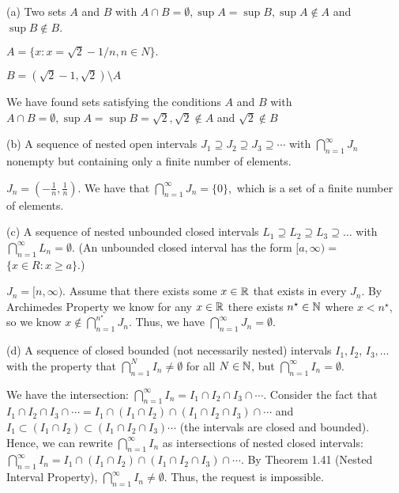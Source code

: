 \documentclass{report}
\begin{document}

(a) Two sets $A$ and $B$ with $A \cap B=\emptyset, \sup A=\sup B, \sup A \notin A$ and $\sup B \notin B$.

\par \bigskip 
$ A = \{ x : x = \sqrt{2} - 1/n, n \in N \}.$ \par $B = (\sqrt{2} -1,\sqrt{2}) \setminus A$ 
\par We have found sets satisfying the conditions $A$ and $B$ with $A \cap B=\emptyset, \sup A=\sup B = \sqrt{2}, \sqrt{2} \notin A$ and $\sqrt{2} \notin B$


\par \bigskip
(b) A sequence of nested open intervals $J_1 \supseteq J_2 \supseteq J_3 \supseteq \cdots$ with $\bigcap_{n=1}^{\infty} J_n$ nonempty but containing only a finite number of elements.
\par \bigskip 
$J_n = (-\frac{1}{n}, \frac{1}{n})$. We have that $\bigcap_{n=1}^{\infty} J_n = \{0\},$ which is a set of a finite number of elements.
\par \bigskip
(c) A sequence of nested unbounded closed intervals $L_1 \supseteq L_2 \supseteq L_3 \supseteq \ldots$ with $\bigcap_{n=1}^{\infty} L_n=\emptyset$. (An unbounded closed interval has the form $[a, \infty)=$ $\{x \in R: x \geq a\}$.)
\bigskip

$J_n = [n, \infty)$. Assume that there exists some $x \in \RR$ that exists in every $J_n$. By Archimedes Property we know for any $x \in \RR$ there exists $n^\star \in \NN$ where $ x < n^\star$, so we know $x \not\in \bigcap_{n=1}^{n^\star} J_n$. Thus, we have $\bigcap_{n=1}^{\infty} J_n = \emptyset.$ 

\par \bigskip
(d) A sequence of closed bounded (not necessarily nested) intervals $I_1, I_2$, $I_3, \ldots$ with the property that $\bigcap_{n=1}^N I_n \neq \emptyset$ for all $N \in \NN$, but $\bigcap_{n=1}^{\infty} I_n=\emptyset$.

\par \bigskip
We have the intersection: $\bigcap_{n=1}^\infty I_n = I_1 \cap I_2 \cap I_3 \cap \cdots$. Consider the fact that  $I_1 \cap I_2 \cap I_3 \cap \cdots = I_1 \cap (I_1 \cap  I_2) \cap (I_1 \cap I_2 \cap I_3) \cap \cdots$ and $I_1 \subset (I_1 \cap I_2) \subset (I_1 \cap I_2 \cap I_3) \cdots$ (the intervals are closed and bounded).  Hence, we can rewrite $\bigcap_{n=1}^\infty I_n$ as intersections of nested  closed intervals: $\bigcap_{n=1}^\infty I_n = I_1 \cap (I_1 \cap  I_2) \cap (I_1 \cap I_2 \cap I_3) \cap \cdots$. By Theorem 1.41 (Nested Interval Property), $\bigcap_{n=1}^\infty I_n \neq \emptyset.$ Thus, the request is impossible.
\end{document}
